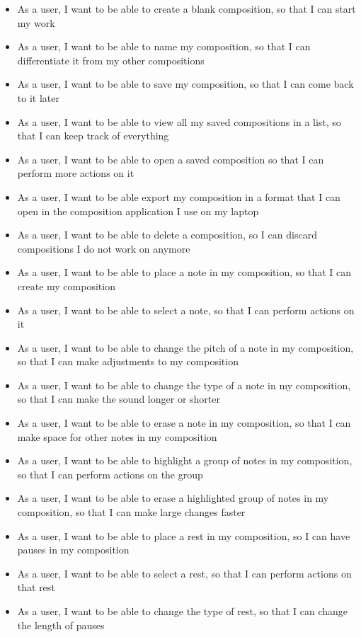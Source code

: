   \begin{itemize}
    \item As a user, I want to be able to create a blank composition, so that I can start my work
    \item As a user, I want to be able to name my composition, so that I can differentiate it from my other compositions
    \item As a user, I want to be able to save my composition, so that I can come back to it later
    \item As a user, I want to be able to view all my saved compositions in a list, so that I can keep track of everything
    \item As a user, I want to be able to open a saved composition so that I can perform more actions on it
    \item As a user, I want to be able export my composition in a format that I can open in the composition application I use on my laptop
    \item As a user, I want to be able to delete a composition, so I can discard compositions I do not work on anymore
    \item As a user, I want to be able to place a note in my composition, so that I can create my composition
    \item As a user, I want to be able to select a note, so that I can perform actions on it
    \item As a user, I want to be able to change the pitch of a note in my composition, so that I can make adjustments to my composition
    \item As a user, I want to be able to change the type of a note in my composition, so that I can make the sound longer or shorter
    \item As a user, I want to be able to erase a note in my composition, so that I can make space for other notes in my composition
    \item As a user, I want to be able to highlight a group of notes in my composition, so that I can perform actions on the group
    \item As a user, I want to be able to erase a highlighted group of notes in my composition, so that I can make large changes faster
    \item As a user, I want to be able to place a rest in my composition, so I can have pauses in my composition
    \item As a user, I want to be able to select a rest, so that I can perform actions on that rest
    \item As a user, I want to be able to change the type of rest, so that I can change the length of pauses

\end{itemize}
